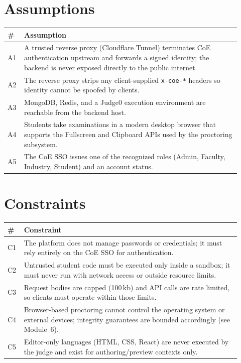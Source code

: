 \documentclass[12pt,a4paper,oneside]{report}
\newcommand{\code}[1]{\texttt{#1}}
\begin{document}
\section{Assumptions}
\begin{longtable}{@{}p{0.05\linewidth} p{0.87\linewidth}@{}}
\toprule
\textbf{\#} & \textbf{Assumption}\\
\midrule
\endhead
A1 & A trusted reverse proxy (Cloudflare Tunnel) terminates CoE authentication upstream and forwards a signed identity; the backend is never exposed directly to the public internet.\\
A2 & The reverse proxy strips any client-supplied \code{x-coe-*} headers so identity cannot be spoofed by clients.\\
A3 & MongoDB, Redis, and a Judge0 execution environment are reachable from the backend host.\\
A4 & Students take examinations in a modern desktop browser that supports the Fullscreen and Clipboard APIs used by the proctoring subsystem.\\
A5 & The CoE SSO issues one of the recognized roles (Admin, Faculty, Industry, Student) and an account status.\\
\bottomrule
\end{longtable}

\section{Constraints}
\begin{longtable}{@{}p{0.05\linewidth} p{0.87\linewidth}@{}}
\toprule
\textbf{\#} & \textbf{Constraint}\\
\midrule
\endhead
C1 & The platform does not manage passwords or credentials; it must rely entirely on the CoE SSO for authentication.\\
C2 & Untrusted student code must be executed only inside a sandbox; it must never run with network access or outside resource limits.\\
C3 & Request bodies are capped (100\,kb) and API calls are rate limited, so clients must operate within those limits.\\
C4 & Browser-based proctoring cannot control the operating system or external devices; integrity guarantees are bounded accordingly (see Module~6).\\
C5 & Editor-only languages (HTML, CSS, React) are never executed by the judge and exist for authoring/preview contexts only.\\
\bottomrule
\end{longtable}
\end{document}
